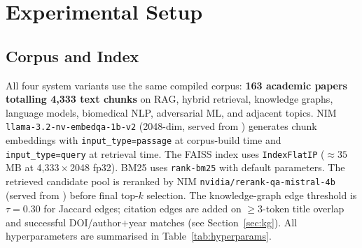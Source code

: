 \documentclass[journal]{IEEEtran}
\begin{document}
\section{Experimental Setup}
\label{sec:setup}

\subsection{Corpus and Index}
All four system variants use the same compiled corpus: \textbf{163
academic papers totalling 4{,}333 text chunks} on RAG, hybrid
retrieval, knowledge graphs, language models, biomedical NLP,
adversarial ML, and adjacent topics. NIM
\texttt{llama-3.2-nv-embedqa-1b-v2} (2048-dim, served from
) generates chunk embeddings
with \texttt{input\_type=passage} at corpus-build time and
\texttt{input\_type=query} at retrieval time. The FAISS index uses
\texttt{IndexFlatIP} ($\approx 35$\,MB at 4{,}333\,$\times$\,2048 fp32).
BM25 uses \texttt{rank-bm25} with default parameters. The retrieved
candidate pool is reranked by NIM \texttt{nvidia/rerank-qa-mistral-4b}
(served from
) before
final top-$k$ selection. The knowledge-graph edge threshold is
$\tau = 0.30$ for Jaccard edges; citation edges are added on
$\geq 3$-token title overlap and successful DOI/author$+$year matches
(see Section~\ref{sec:kg}). All hyperparameters are summarised in
Table~\ref{tab:hyperparams}.
\end{document}
